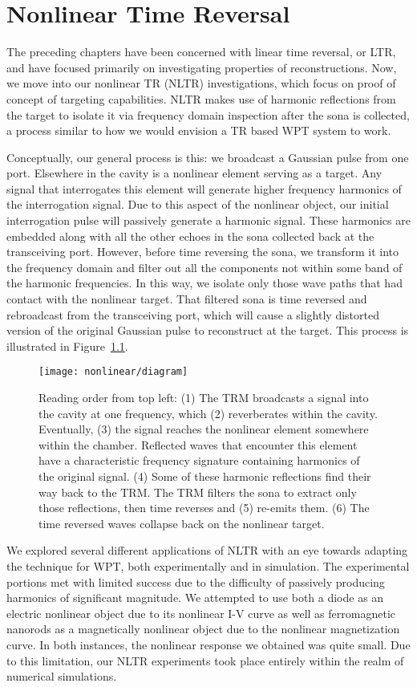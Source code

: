 \chapter{Nonlinear Time Reversal}
\label{ch:nltr}

The preceding chapters have been concerned with linear time reversal, or LTR, and have focused primarily on investigating properties of reconstructions. Now, we move into our nonlinear TR (NLTR) investigations, which focus on proof of concept of targeting capabilities. NLTR makes use of harmonic reflections from the target to isolate it via frequency domain inspection after the sona is collected, a process similar to how we would envision a TR based WPT system to work.

Conceptually, our general process is this: we broadcast a Gaussian pulse from one port. Elsewhere in the cavity is a nonlinear element serving as a target. Any signal that interrogates this element will generate higher frequency harmonics of the interrogation signal. Due to this aspect of the nonlinear object, our initial interrogation pulse will passively generate a harmonic signal. These harmonics are embedded along with all the other echoes in the sona collected back at the transceiving port. However, before time reversing the sona, we transform it into the frequency domain and filter out all the components not within some band of the harmonic frequencies. In this way, we isolate only those wave paths that had contact with the nonlinear target. That filtered sona is time reversed and rebroadcast from the transceiving port, which will cause a slightly distorted version of the original Gaussian pulse to reconstruct at the target. This process is illustrated in Figure~\ref{fig:nonlinear-diagram}.

\begin{figure}[]
\centering
\texttt{[image: nonlinear/diagram]}
    \caption[Conceptual overview of nonlinear time reversal]{Reading order from top left: (1) The TRM broadcasts a signal into the cavity at one frequency, which (2) reverberates within the cavity. Eventually, (3) the signal reaches the nonlinear element somewhere within the chamber. Reflected waves that encounter this element have a characteristic frequency signature containing harmonics of the original signal. (4) Some of these harmonic reflections find their way back to the TRM. The TRM filters the sona to extract only those reflections, then time reverses and (5) re-emits them. (6) The time reversed waves collapse back on the nonlinear target.}
    \label{fig:nonlinear-diagram}
\end{figure}

We explored several different applications of NLTR with an eye towards adapting the technique for WPT, both experimentally and in simulation. The experimental portions met with limited success due to the difficulty of passively producing harmonics of significant magnitude. We attempted to use both a diode as an electric nonlinear object due to its nonlinear I-V curve as well as ferromagnetic nanorods as a magnetically nonlinear object due to the nonlinear magnetization curve. In both instances, the nonlinear response we obtained was quite small. Due to this limitation, our NLTR experiments took place entirely within the realm of numerical simulations.
